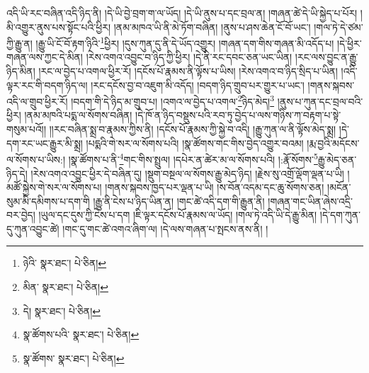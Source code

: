 འདི་ཡི་རང་བཞིན་འདི་ཉིད་ནི། །དེ་ཡི་བྱེ་བྲག་ག་ལ་ཡོད། །དེ་ཡི་ནུས་པ་དང་བྲལ་ན། །གཞན་ཚེ་དེ་ཡི་སྐྱེད་པ་པོར། །མི་འགྱུར་ནུས་པས་སྟོང་པའི་ཕྱིར། །ནམ་མཁའ་ཡི་ནི་མེ་ཏོག་བཞིན། །ནུས་པ་ཤས་ཆེན་ངོ་བོ་ཡང་། །གལ་ཏེ་དེ་ཙམ་ཀྱི་རྒྱུ་ན། །རྒྱུ་ཡི་ངོ་བོ་རྟག་ཉིའི་\footnote{ཉེའི་  སྣར་ཐང་།  པེ་ཅིན། }ཕྱིར། །དུས་ཀུན་དུ་ནི་དེ་ཡོད་འགྱུར། །གཞན་དག་གིས་གཞན་མི་འདོད་པ། །དེ་ཕྱིར་གཞན་ལས་ཀྱང་དེ་མིན། །རེས་འགའ་འབྱུང་བ་ཉིད་ཀྱི་ཕྱིར། །དེ་ནི་རང་དབང་ཅན་ཡང་ཡིན། །རང་ལས་བྱུང་ན་རྒྱུ་ཉིད་མིན། །རང་ལ་བྱེད་པ་འགལ་ཕྱིར་རོ། །དངོས་པོ་རྣམས་ནི་ལྟོས་པ་ཡིས། །རེས་འགའ་བ་ཉིད་སྲིད་པ་ཡིན། །འདི་ལྟར་རང་གི་བདག་ཉིད་ལ། །རང་དངོས་བྱ་བ་འཇུག་མི་འདོད། །བདག་ཉིད་གྲུབ་པར་གྱུར་པ་ཡང་། །གནས་སྐབས་འདི་ལ་གྲུབ་ཕྱིར་རོ། །བདག་གི་དེ་ཉིད་མ་གྲུབ་པ། །འགའ་ལ་བྱེད་པ་འགལ་\footnote{མིན་  སྣར་ཐང་།  པེ་ཅིན། }ཉིད་མེད།\footnote{དེ།  སྣར་ཐང་།  པེ་ཅིན། } །ནུས་པ་ཀུན་དང་བྲལ་བའི་ཕྱིར། །ནམ་མཁའི་པདྨ་ལ་སོགས་བཞིན། །དེ་ཁོ་ན་ཉིད་བསྡུས་པའི་རབ་ཏུ་བྱེད་པ་ལས་གཉིས་ཀ་བརྟག་པ་སྟེ་གསུམ་པའོ།། །།རང་བཞིན་སྨྲ་བ་རྣམས་ཀྱིས་ནི། །དངོས་པོ་རྣམས་ཀྱི་སྐྱེ་བ་འདི། །རྒྱུ་ཀུན་ལ་ནི་ལྟོས་མེད་སྨྲ། །དེ་དག་རང་ཡང་རྒྱུར་མི་སྨྲ། །པདྨའི་གེ་སར་ལ་སོགས་པའི། །སྣ་ཚོགས་གང་གིས་བྱེད་འགྱུར་བའམ། །རྨ་བྱའི་མདོངས་ལ་སོགས་པ་ཡིས:། །སྣ་ཚོགས་པ་ནི་\footnote{སྣ་ཚོགས་པའི་  སྣར་ཐང་།  པེ་ཅིན། }གང་གིས་སྤྲུལ། །དཔེར་ན་ཚེར་མ་ལ་སོགས་པའི། །:རྣོ་སོགས་\footnote{སྣ་ཚོགས་  སྣར་ཐང་།  པེ་ཅིན། }རྒྱུ་མེད་ཅན་ཉིད་དེ། །རེས་འགའ་འབྱུང་ཕྱིར་དེ་བཞིན་དུ། །སྡུག་བསྔལ་ལ་སོགས་རྒྱུ་མེད་ཉིད། །རྗེས་སུ་འགྲོ་ལྡོག་ལྡན་པ་ཡི། །མཚོ་སྐྱེས་གེ་སར་ལ་སོགས་པ། །གནས་སྐབས་ཁྱད་པར་ལྡན་པ་ཡི། །ས་བོན་འདམ་དང་ཆུ་སོགས་ཅན། །མངོན་སུམ་མི་དམིགས་པ་དག་གི །རྒྱུ་ནི་ངེས་པ་ཉིད་ཡིན་ན། །གང་ཚེ་འདི་དག་གི་རྒྱུན་ནི། །གཞན་གང་ཡིན་ཞེས་འདྲི་བར་བྱེད། །ཡུལ་དང་དུས་ཀྱི་ངེས་པ་དག །ཇི་ལྟར་དངོས་པོ་རྣམས་ལ་ཡོད། །གལ་ཏེ་འདི་ཡི་དེ་རྒྱུ་མིན། །དེ་དག་ཀུན་དུ་ཀུན་འབྱུང་ཚེ། །གང་དུ་གང་ཚེ་འགའ་ཞིག་ལ། །དེ་ལས་གཞན་པ་སྤངས་ནས་ནི། །
